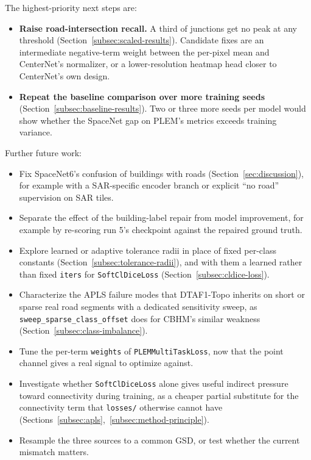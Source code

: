 The highest-priority next steps are:
\begin{itemize}
  \item \textbf{Raise road-intersection recall.} A third of junctions get no peak at any threshold
    (Section~\ref{subsec:scaled-results}). Candidate fixes are an intermediate negative-term weight
    between the per-pixel mean and CenterNet's normalizer, or a lower-resolution heatmap head closer
    to CenterNet's own design.
  \item \textbf{Repeat the baseline comparison over more training seeds}
    (Section~\ref{subsec:baseline-results}). Two or three more seeds per model would show whether
    the SpaceNet gap on PLEM's metrics exceeds training variance.
\end{itemize}

Further future work:
\begin{itemize}
  \item Fix SpaceNet6's confusion of buildings with roads (Section~\ref{sec:discussion}), for
    example with a SAR-specific encoder branch or explicit ``no road'' supervision on SAR tiles.
  \item Separate the effect of the building-label repair from model improvement, for example by
    re-scoring run 5's checkpoint against the repaired ground truth.
  \item Explore learned or adaptive tolerance radii in place of fixed per-class constants
    (Section~\ref{subsec:tolerance-radii}), and with them a learned rather than fixed
    \texttt{iters} for \texttt{SoftClDiceLoss} (Section~\ref{subsec:cldice-loss}).
  \item Characterize the APLS failure modes that DTAF1-Topo inherits on short or sparse real road
    segments with a dedicated sensitivity sweep, as \texttt{sweep\_sparse\_class\_offset} does for
    CBHM's similar weakness (Section~\ref{subsec:class-imbalance}).
  \item Tune the per-term \texttt{weights} of \texttt{PLEMMultiTaskLoss}, now that the point
    channel gives a real signal to optimize against.
  \item Investigate whether \texttt{SoftClDiceLoss} alone gives useful indirect pressure toward
    connectivity during training, as a cheaper partial substitute for the connectivity term that
    \texttt{losses/} otherwise cannot have
    (Sections~\ref{subsec:apls},~\ref{subsec:method-principle}).
  \item Resample the three sources to a common GSD, or test whether the current mismatch matters.
\end{itemize}
